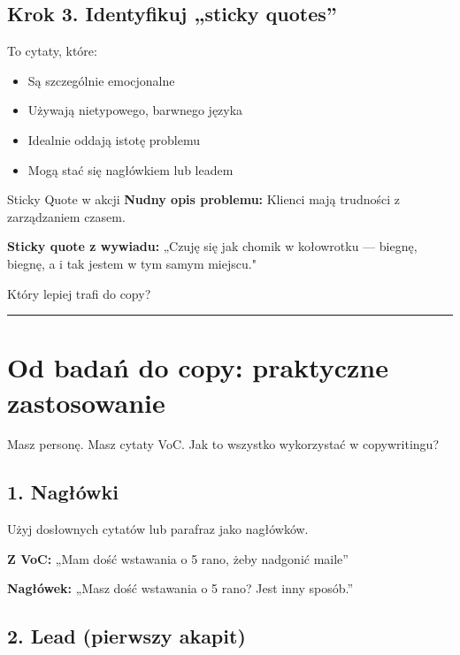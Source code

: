 \documentclass[
  12pt,
  a4paper,
  twoside,
  openright,
  12pt,
  DIV=12,
  BCOR=12mm]{scrbook}
\providecommand{\tightlist}{%
  \setlength{\itemsep}{0pt}\setlength{\parskip}{0pt}}\usepackage{longtable,booktabs,array}
\newcommand{\decoline}{%
  \begin{center}
    \textcolor{bordergray}{\rule{0.3\textwidth}{0.5pt}}
  \end{center}
}
\begin{document}
\subsection{Krok 3. Identyfikuj „sticky
quotes''}\label{krok-3.-identyfikuj-sticky-quotes}

To cytaty, które:

\begin{itemize}
\tightlist
\item
  Są szczególnie emocjonalne
\item
  Używają nietypowego, barwnego języka
\item
  Idealnie oddają istotę problemu
\item
  Mogą stać się nagłówkiem lub leadem
\end{itemize}

\begin{przyklad}{Sticky Quote w akcji}
\textbf{Nudny opis problemu:} Klienci mają trudności z zarządzaniem czasem.

\textbf{Sticky quote z wywiadu:} „Czuję się jak chomik w kołowrotku --- biegnę, biegnę, a i tak jestem w tym samym miejscu."

Który lepiej trafi do copy?
\end{przyklad}

\decoline

\section{Od badań do copy: praktyczne
zastosowanie}\label{od-badaux144-do-copy-praktyczne-zastosowanie}

Masz personę. Masz cytaty VoC. Jak to wszystko wykorzystać w
copywritingu?

\subsection{1. Nagłówki}\label{nagux142uxf3wki}

Użyj dosłownych cytatów lub parafraz jako nagłówków.

\textbf{Z VoC:} „Mam dość wstawania o 5 rano, żeby nadgonić maile''

\textbf{Nagłówek:} „Masz dość wstawania o 5 rano? Jest inny sposób.''

\subsection{2. Lead (pierwszy akapit)}\label{lead-pierwszy-akapit}
\end{document}
